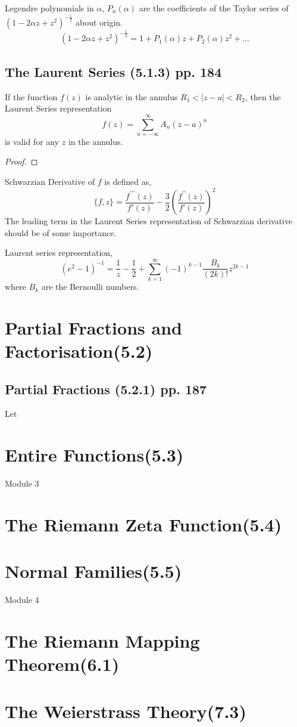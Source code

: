 \begin{definition}
	Legendre polynomials in $\alpha$, $P_n(\alpha)$ are the coefficients of the Taylor series of $(1-2\alpha z + z^2)^{-\frac{1}{2}}$ about origin.
	\begin{equation}
		(1-2\alpha z + z^2)^{-\frac{1}{2}} = 1 + P_1(\alpha)z + P_2(\alpha)z^2+\dots
	\end{equation}
\end{definition}

\subsection{The Laurent Series (5.1.3) pp. 184}
\begin{remark}
	If the function $f(z)$ is analytic in the annulus $R_1 < |z-a| < R_2$, then the Laurent Series representation
	\begin{equation}
		f(z) = \sum_{n = -\infty}^\infty A_n (z-a)^n
	\end{equation}
	is valid for any $z$ in the annulus.
\end{remark}
\begin{proof}
\end{proof}

\begin{definition}
	Schwarzian Derivative of $f$ is defined as,
	\[ \{f,z\} = \frac{f^{\prime\prime\prime}(z)}{f'(z)} - \frac{3}{2} \left(\frac{f^{\prime\prime}(z)}{f'(z)}\right)^2 \]
	The leading term in the Laurent Series representation of Schwarzian derivative should be of some importance.
\end{definition}

\begin{remark}
	Laurent series representation,
	\[ (e^2-1)^{-1} = \frac{1}{z} - \frac{1}{2} + \sum_{k=1}^\infty (-1)^{k-1}\frac{B_k}{(2k)!} z^{2k-1} \]
	where $B_k$ are the Bernoulli numbers.
\end{remark}
\section{Partial Fractions and Factorisation(5.2)}
\subsection{Partial Fractions (5.2.1) pp. 187}
\begin{theorem}
	Let 
\end{theorem}
\section{Entire Functions(5.3)}
\pagebreak
{\Large Module 3}
\section{The Riemann Zeta Function(5.4)}
\section{Normal Families(5.5)}
\pagebreak
{\Large Module 4}
\section{The Riemann Mapping Theorem(6.1)}
\section{The Weierstrass Theory(7.3)}
